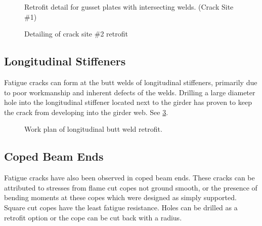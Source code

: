 \begin{figure}
  \caption{Retrofit detail for gusset plates with intersecting welds. (Crack Site \#1)}
  \label{fig:retorfit-detail-gusset-plates}
\end{figure}

\begin{figure}
  \caption{Detailing of crack site \#2 retrofit}
  \label{fig:detailing-crack-site2-retrofit}
\end{figure}

\subsection{Longitudinal Stiffeners}
Fatigue cracks can form at the butt welds of longitudinal stiffeners, primarily due to poor workmanship and
inherent defects of the welds. Drilling a large diameter hole into the longitudinal stiffener located next to the girder
has proven to keep the crack from developing into the girder web. See \cref{fig:work-plan-butt-weld-retrofit}.

\begin{figure}
  \caption{Work plan of longitudinal butt weld retrofit.}
  \label{fig:work-plan-butt-weld-retrofit}
\end{figure}

\subsection{Coped Beam Ends}
Fatigue cracks have also been observed in coped beam ends. These cracks can be attributed to stresses from
flame cut copes not ground smooth, or the presence of bending moments at these copes which were designed as
simply supported. Square cut copes have the least fatigue resistance. Holes can be drilled as a retrofit option or the
cope can be cut back with a radius.



